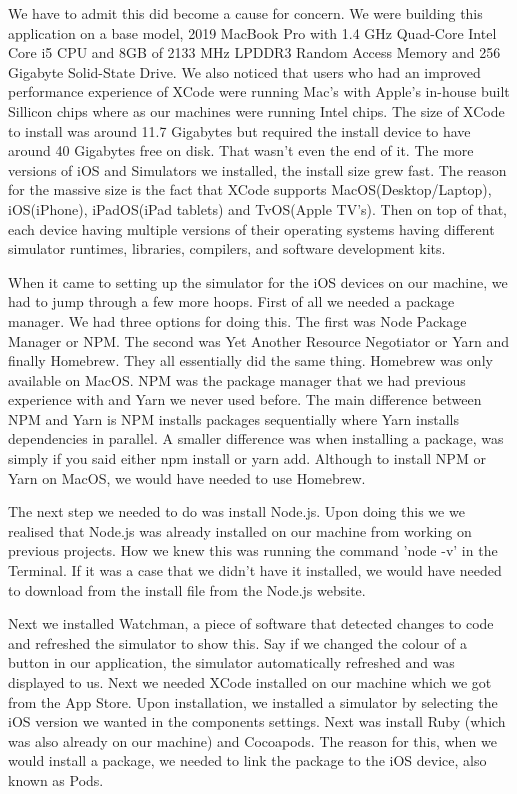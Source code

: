 We have to admit this did become a cause for concern. We were building this application on a base model, 2019 MacBook Pro with 1.4 GHz Quad-Core Intel Core i5 CPU and 8GB of 2133 MHz LPDDR3 Random Access Memory and 256 Gigabyte Solid-State Drive. We also noticed that users who had an improved performance experience of XCode were running Mac's with Apple's in-house built Sillicon chips where as our machines were running Intel chips. The size of XCode to install was around 11.7 Gigabytes but required the install device to have around 40 Gigabytes free on disk. That wasn't even the end of it. The more versions of iOS and Simulators we installed, the install size grew fast. The reason for the massive size is the fact that XCode supports MacOS(Desktop/Laptop), iOS(iPhone), iPadOS(iPad tablets) and TvOS(Apple TV's). Then on top of that, each device having multiple versions of their operating systems having different simulator runtimes, libraries, compilers, and software development kits.

When it came to setting up the simulator for the iOS devices on our machine, we had to jump through a few more hoops. First of all we needed a package manager. We had three options for doing this. The first was Node Package Manager or NPM. The second was Yet Another Resource Negotiator or Yarn and finally Homebrew. They all essentially did the same thing. Homebrew was only available on MacOS. NPM was the package manager that we had previous experience with and Yarn we never used before. The main difference between NPM and Yarn is NPM installs packages sequentially where Yarn installs dependencies in parallel. A smaller difference was when installing a package, was simply if you said either npm install or yarn add. Although to install NPM or Yarn on MacOS, we would have needed to use Homebrew. 

The next step we needed to do was install Node.js\cite{setUpDevEnviro}. Upon doing this we we realised that Node.js was already installed on our machine from working on previous projects. How we knew this was running the command 'node -v' in the Terminal. If it was a case that we didn't have it installed, we would have needed to download from the install file from the Node.js website.

Next we installed Watchman, a piece of software that detected changes to code and refreshed the simulator to show this\cite{setUpDevEnviro}. Say if we changed the colour of a button in our application, the simulator automatically refreshed and was displayed to us. Next we needed XCode installed on our machine which we got from the App Store. Upon installation, we installed a simulator by selecting the iOS version we wanted in the components settings. Next was install Ruby (which was also already on our machine) and Cocoapods. The reason for this, when we would install a package, we needed to link the package to the iOS device, also known as Pods\cite{setUpDevEnviro}.

